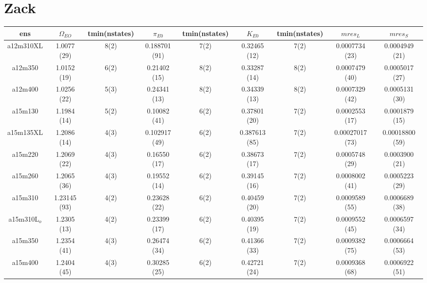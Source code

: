 \documentclass{article}
\begin{document}
 \section*{Zack}
 \begin{table}[h!]
  \centering
 \setlength{\arrayrulewidth}{0.5mm}
\setlength{\tabcolsep}{13pt}
\renewcommand{\arraystretch}{2}
 \begin{tabular}{|| c |c | c | c | c | c | c | c | c ||} 
 \hline
 ens &  $\Omega_{EO}$ & tmin(nstates) & $\pi_{E0}$  & tmin(nstates)& $K_{E0}$  & tmin(nstates) & $mres_{L}$ & $mres_{S}$\\ [0.8ex] 
 \hline\hline
 a12m310XL 
 & {1.0077 (29)}   &   {8(2)} & {0.188701 (91)}   & {7(2)}   & {0.32465 (12)}  & {7(2)}   & {0.0007734 (23)}  & {0.0004949 (21)} \\ 
 \hline
 a12m350 
 & {1.0152 (19)}   &   {6(2)} & {0.21402 (15)}   & {8(2)}   & {0.33287 (14)}  & {8(2)}   & {0.0007479 (40)}  & {0.0005017 (27)}  \\
 \hline
 a12m400 
  & {1.0256 (22)}   &   {5(3)} & {0.24341 (13)}   & {8(2)}   & {0.34339 (13)}  & {8(2)}   & {0.0007329 (42)}  & {0.0005131 (30)}  \\
 \hline
 a15m130
  & {1.1984 (14)}   &   {5(2)} & {0.10082 (41)}   & {6(2)}   & {0.37801 (20)}  & {7(2)}   & {0.0002553 (17)}  & {0.0001879 (15)}   \\
 \hline
 a15m135XL 
 & {1.2086 (14)}   &   {4(3)} & {0.102917 (49)}   & {6(2)}   & {0.387613 (85)}  & {7(2)}   & {0.00027017 (73)}  & {0.00018800 (59)} \\
 \hline
 a15m220
  & {1.2069 (22)}   &   {4(3)} & {0.16550 (17)}   & {6(2)}   & {0.38673 (17)}  & {7(2)}   & {0.0005748 (29)}  & {0.0003900 (21)} \\
 \hline
 a15m260
  & {1.2065 (36)}   &   {4(3)} & {0.19552 (14)}   & {6(2)}   & {0.39145 (16)}  & {7(2)}   & {0.0008002 (41)}  & {0.0005223 (29)} \\
 \hline
 a15m310 
  & {1.23145 (93)}   &   {4(2)} & {0.23628 (22)}  & {6(2)}   & {0.40459 (20)}  & {7(2)}   & {0.0009589 (55)}  & {0.0006689 (38)} \\
 \hline
 a15m310L$_o$ 
  & {1.2305 (13)}   &   {4(2)} & {0.23399 (17)}   & {6(2)}   & {0.40395 (19)}   & {7(2)}  & {0.0009552 (45)}  & {0.0006597 (34)}\\
 \hline
 a15m350 
  & {1.2354 (41)}   &   {4(3)} & {0.26474 (34)}   & {6(2)}   & {0.41366 (33)}  & {7(2)}  & {0.0009382 (75)}  & {0.0006664 (53)} \\
 \hline
  a15m400 
  & {1.2404 (45)}   &   {4(3)} & {0.30285 (25)}   & {6(2)}   & {0.42721 (24)}  & {7(2)}  & {0.0009368 (68)}  & {0.0006922 (51)} \\
  \hline
 
 \end{tabular}
\end{table}
\clearpage
\end{document}
